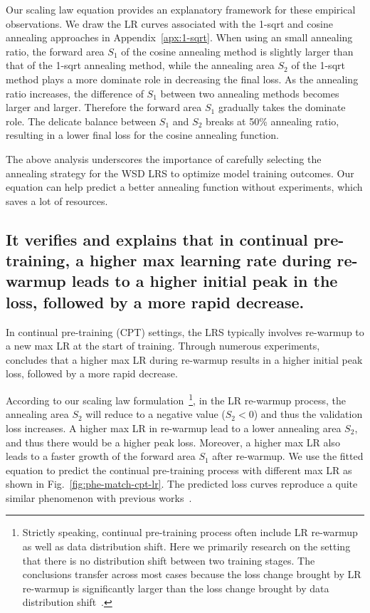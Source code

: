 Our scaling law equation provides an explanatory framework for these empirical observations. We draw the LR curves associated with the 1-sqrt and cosine annealing approaches in Appendix~\ref{apx:1-sqrt}.
When using an small annealing ratio, the forward area \(S_1\) of the cosine annealing method is slightly larger than that of the 1-sqrt annealing method, while the annealing area \(S_2\) of the 1-sqrt method plays a more dominate role in decreasing the final loss. As the annealing ratio increases, the difference of $S_1$ between two annealing methods becomes larger and larger. Therefore the forward area \(S_1\) gradually takes the dominate role. The delicate balance between $S_1$ and $S_2$ breaks at 50\% annealing ratio, resulting in a lower final loss for the cosine annealing function.

The above analysis underscores the importance of carefully selecting the annealing strategy for the WSD LRS to optimize model training outcomes. Our equation can help predict a better annealing function without experiments, which saves a lot of resources. 

\subsection{\color{cyan} It verifies and explains that in continual pre-training, a higher max learning rate during re-warmup leads to a higher initial peak in the loss, followed by a more rapid decrease.}
\label{apx:takeaway-cpt-peaklr}

In continual pre-training (CPT) settings, the LRS typically involves re-warmup to a new max LR at the start of training. 
Through numerous experiments,~\citet{gupta2023continualpretraininglargelanguage} concludes that a higher max LR during re-warmup results in a higher initial peak loss, followed by a more rapid decrease. 

According to our scaling law formulation~\footnote{Strictly speaking, continual pre-training process often include LR re-warmup as well as data distribution shift. Here we primarily research on the setting that there is no distribution shift between two training stages. The conclusions transfer across most cases because the loss change brought by LR re-warmup is significantly larger than the loss change brought by data distribution shift~\citep{gupta2023continualpretraininglargelanguage,simple-scalable-cpt2024}.}, in the LR re-warmup process, the annealing area $S_{2}$ will reduce to a negative value ($S_2<0$) and thus the validation loss increases. A higher max LR in re-warmup lead to a lower annealing area $S_{2}$, and thus there would be a higher peak loss. 
Moreover, a higher max LR also leads to a faster growth of the forward area $S_{1}$ after re-warmup. We use the fitted equation to predict the continual pre-training process with different max LR as shown in Fig.~\ref{fig:phe-match-cpt-lr}. The predicted loss curves reproduce a quite similar phenomenon with previous works~\citep{gupta2023continualpretraininglargelanguage}. 

